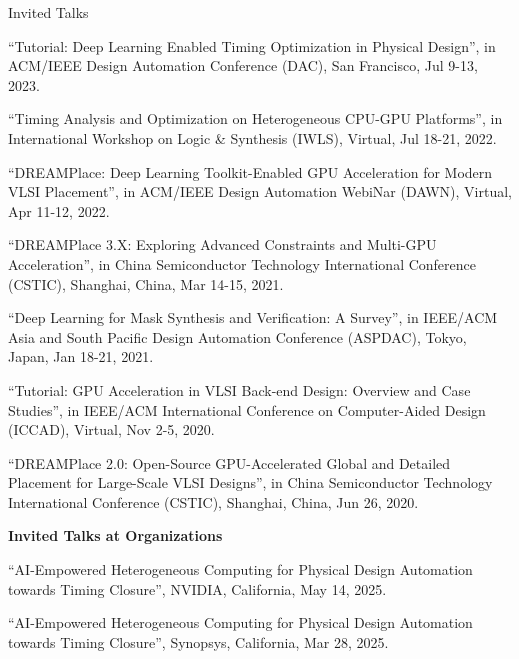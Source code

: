 \begin{rSection}{Invited Talks}
\begin{description}[font=\normalfont]
\item[{[7]}]{
``Tutorial: Deep Learning Enabled Timing Optimization in Physical Design'', in ACM/IEEE Design Automation Conference (DAC), San Francisco, Jul 9-13, 2023. 
}

\item[{[6]}]{
``Timing Analysis and Optimization on Heterogeneous CPU-GPU Platforms'', in International Workshop on Logic \& Synthesis (IWLS), Virtual, Jul 18-21, 2022. 
}

\item[{[5]}]{
``DREAMPlace: Deep Learning Toolkit-Enabled GPU Acceleration for Modern VLSI Placement'', in ACM/IEEE Design Automation WebiNar (DAWN), Virtual, Apr 11-12, 2022. 
}

\item[{[4]}]{
``DREAMPlace 3.X: Exploring Advanced Constraints and Multi-GPU Acceleration'', in China Semiconductor Technology International Conference (CSTIC), Shanghai, China, Mar 14-15, 2021. 
}

\item[{[3]}]{
``Deep Learning for Mask Synthesis and Verification: A Survey'', in IEEE/ACM Asia and South Pacific Design Automation Conference (ASPDAC), Tokyo, Japan, Jan 18-21, 2021.
}

\item[{[2]}]{
``Tutorial: GPU Acceleration in VLSI Back-end Design: Overview and Case Studies'', in IEEE/ACM International Conference on Computer-Aided Design (ICCAD), Virtual, Nov 2-5, 2020. 
}

\item[{[1]}]{
``DREAMPlace 2.0: Open-Source GPU-Accelerated Global and Detailed Placement for Large-Scale VLSI Designs'', in China Semiconductor Technology International Conference (CSTIC), Shanghai, China, Jun 26, 2020. 
}

\end{description}

\textbf{Invited Talks at Organizations}
        
\begin{description}[font=\normalfont]

\item[{[15]}]{
``AI-Empowered Heterogeneous Computing for Physical Design Automation towards Timing Closure'', NVIDIA, California, May 14, 2025. 
}

\item[{[14]}]{
``AI-Empowered Heterogeneous Computing for Physical Design Automation towards Timing Closure'', Synopsys, California, Mar 28, 2025. 
}


\end{description}
\end{rSection}

